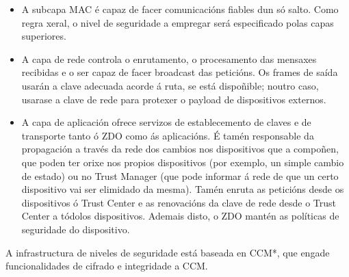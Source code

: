  \begin{itemize}
  \item A subcapa MAC é capaz de facer comunicacións fiables dun só salto. Como
        regra xeral, o nivel de seguridade a empregar será especificado polas
        capas superiores.
  \item A capa de rede controla o enrutamento, o procesamento das mensaxes
        recibidas e o ser capaz de facer broadcast das peticións. Os frames de
        saída usarán a clave adecuada acorde á ruta, se está dispoñible; noutro
        caso, usarase a clave de rede para protexer o payload de dispositivos
        externos.
  \item A capa de aplicación ofrece servizos de establecemento de claves e de
        transporte tanto ó ZDO como ás aplicacións. É tamén responsable da
        propagación a través da rede dos cambios nos dispositivos que a
        compoñen, que poden ter orixe nos propios dispositivos (por exemplo, un
        simple cambio de estado) ou no Trust Manager (que pode informar á rede
        de que un certo dispositivo vai ser elimidado da mesma). Tamén enruta
        as peticións desde os dispositivos ó Trust Center e as renovacións da
        clave de rede desde o Trust Center a tódolos dispositivos. Ademais
        disto, o ZDO mantén as políticas de seguridade do dispositivo.
 \end{itemize}

 A infrastructura de niveles de seguridade está baseada en CCM*, que engade
 funcionalidades de cifrado e integridade a CCM.
